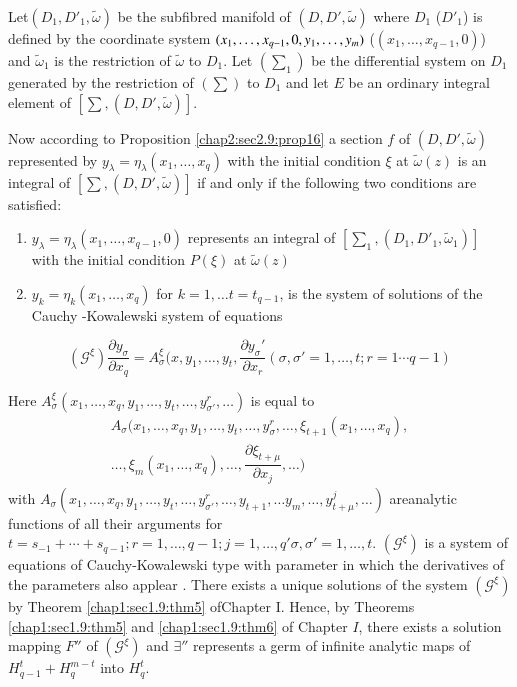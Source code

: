  Let\pageoriginale $(D_1, D'_1 , \tilde{\omega})$ be the subfibred manifold of $(D,
 D' , \tilde{\omega})$ where $D_1$ (\resp  $D'_1$) is defined by the
 coordinate system $(x_1, \ldots , x_{q-1}, 0, y_1 , \ldots ,\break
 y_m)$ (\resp  $(x_1, \ldots , x_{q-1}, 0)$) and $\tilde{\omega}_1$ is
 the restriction of $\tilde{\omega}$ to $D_1$. Let $(\sum_1)$ be the
 differential system on $D_1$ generated by the restriction of $( \sum
 )$ to $D_1$ and let $E$ be an ordinary integral element of $[ \sum,
   (D, D', \tilde{\omega})]$. 
 
Now according to Proposition \ref{chap2:sec2.9:prop16} a section $f$ of $(D, D',
\tilde{\omega})$ represented by $y_ \lambda = \eta_\lambda (x_1,
\ldots , x_q)$ with the initial condition $\xi$ at $\tilde{\omega}
(z)$ is an integral of $[\sum, (D, D', \tilde{\omega})]$ if and only
if the following two conditions are satisfied: 
\begin{enumerate}[(1)]
\item $y_ \lambda = \eta_\lambda (x_1, \ldots , x_{q-1},0)$ represents
  an integral of $[\sum_1, (D_1, D'_1, \tilde{\omega}_1)]$ with the
  initial condition $P(\xi)$ at $\tilde{\omega}(z)$  
\item $y_k = \eta_k (x_1, \ldots , x_q)$ for $k=1, \ldots t =
  t_{q-1}$, is the system of solutions of the Cauchy -Kowalewski
  system  of equations 
\end{enumerate} 
$$
(\mathscr{G}^\xi) \frac{\partial y_\sigma}{\partial x_q} =
A^\xi_\sigma (x,y_1 , \ldots , y_t , \frac{\partial y_\sigma'}{\partial
  x_r} (\sigma, \sigma' = 1, \ldots , t; r=1 \cdots q-1) 
$$ 

Here $A^\xi_\sigma (x_1, \ldots , x_q, y_1 , \ldots , y_t , \ldots ,
y^r_{\sigma'}, \ldots )$ is equal to  
\begin{multline*}
A_\sigma \Big(x_1 , \ldots ,x_q, y_1
, \ldots , y_t , \ldots , y^r_\sigma , \ldots , \xi_{t+1}(x_1 , \ldots
, x_q) ,\\ \ldots , \xi_{m}(x_1 , \ldots , x_q), \ldots ,
\dfrac{\partial \xi_{t + \mu}}{\partial x_j} , \ldots \Big)
\end{multline*}
with
$A_\sigma(x_1 , \ldots , x_q , y_1 , \ldots , y_t , \ldots ,
y^r_{\sigma'} , \ldots , y_{t+1}, \ldots  y_m , \ldots , y^j_{t +  \mu},
\ldots)$ are\break analytic functions of all their arguments for $t=s_{-1}
+ \cdots + s_{q-1} ; r=1, \ldots , q-1; j=1 , \ldots , q' \sigma,
\sigma' =1, \ldots ,t$. $(\mathscr{G}^\xi)$ is a system of equations
of Cauchy-Kowalewski type with parameter in which the derivatives of
the parameters also applear . There exists a unique solutions of the
system $(\mathscr{G}^\xi)$ by Theorem \ref{chap1:sec1.9:thm5} of\pageoriginale Chapter I. Hence, by
Theorems \ref{chap1:sec1.9:thm5} and \ref{chap1:sec1.9:thm6} of
Chapter $I$, there exists a solution mapping 
$F''$ of $(\mathscr{G}^\xi)$ and $\exists ''$ represents a germ of
infinite analytic maps of $H^t_{q-1} + H^{m-t}_q$ into $H^t_q$. 
 
